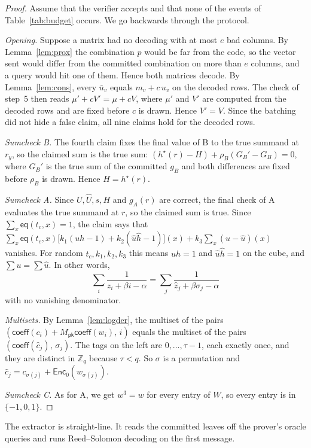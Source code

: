 \documentclass[sigconf,anonymous]{acmart}
\newcommand{\Zq}{\mathbb{Z}_q}
\newcommand{\eq}{\mathsf{eq}}
\newcommand{\EncZ}{\mathsf{Enc}_0}
\newcommand{\coeff}{\mathsf{coeff}}
\newcommand{\Mpk}{M_{\mathsf{pk}}}
\newcommand{\msk}[1]{#1^{\star}}
\newcommand{\uh}{\hat{u}}
\newcommand{\hh}{\hat{h}}
\newcommand{\zh}{\hat{z}}
\newcommand{\ch}{\hat{c}}
\begin{document}
\begin{proof}
Assume that the verifier accepts and that none of the events of Table~\ref{tab:budget} occurs. We go
backwards through the protocol.

\emph{Opening.} Suppose a matrix had no decoding with at most $e$ bad columns. By
Lemma~\ref{lem:prox} the combination $p$ would be far from the code, so the vector sent would differ
from the committed combination on more than $e$ columns, and a query would hit one of them. Hence
both matrices decode. By Lemma~\ref{lem:cons}, every $\bar u_v$ equals $m_v+c\,u_v$ on the decoded
rows. The check of step~5 then reads $\mu'+cV'=\mu+cV$, where $\mu'$ and $V'$ are computed from the
decoded rows and are fixed before $c$ is drawn. Hence $V'=V$. Since the batching did not hide a
false claim, all nine claims hold for the decoded rows.

\emph{Sumcheck B.} The fourth claim fixes the final value of B to the true summand at $r_y$, so the
claimed sum is the true sum:
$(\msk{h}(r)-H)+\rho_B(G_B'-G_B)=0$, where $G_B'$ is the true sum of the committed $g_B$ and both
differences are fixed before $\rho_B$ is drawn. Hence $H=\msk{h}(r)$.

\emph{Sumcheck A.} Since $U,\hat U,s,H$ and $g_A(r)$ are correct, the final check of A evaluates the
true summand at $r$, so the claimed sum is true. Since $\sum_x\eq(t_c,x)=1$, the claim says that
$\sum_x\eq(t_c,x)\bigl[k_1(u h-1)+k_2(\uh\hh-1)\bigr](x)+k_3\sum_x(u-\uh)(x)$ vanishes. For random
$t_c,k_1,k_2,k_3$ this means $uh=1$ and $\uh\hh=1$ on the cube, and $\sum u=\sum\uh$. In other words,
\[
  \sum_i\frac{1}{z_i+\beta i-\alpha}=\sum_j\frac{1}{\zh_j+\beta\sigma_j-\alpha}
\]
with no vanishing denominator.

\emph{Multisets.} By Lemma~\ref{lem:logder}, the multiset of the pairs
$(\coeff(c_i)+\Mpk\coeff(w_i),\,i)$ equals the multiset of the pairs $(\coeff(\ch_j),\,\sigma_j)$. The
tags on the left are $0,\dots,\tau-1$, each exactly once, and they are distinct in $\Zq$ because
$\tau<q$. So $\sigma$ is a permutation and $\ch_j=c_{\sigma(j)}+\EncZ(w_{\sigma(j)})$.

\emph{Sumcheck C.} As for A, we get $w^3=w$ for every entry of $W$, so every entry is in
$\{-1,0,1\}$.
\end{proof}

The extractor is straight-line. It reads the committed leaves off the prover's oracle queries and
runs Reed--Solomon decoding on the first message.
\end{document}
